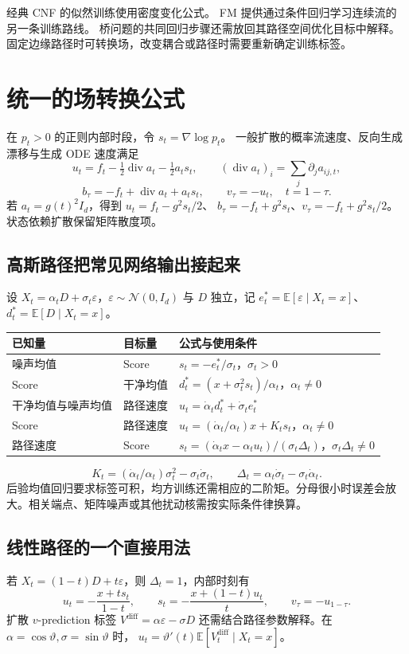 \documentclass[language=chinese,margin=right,11pt]{lumenbook}
\begin{document}
经典 CNF 的似然训练使用密度变化公式。
FM 提供通过条件回归学习连续流的另一条训练路线。
桥问题的共同回归步骤还需放回其路径空间优化目标中解释。
固定边缘路径时可转换场，改变耦合或路径时需要重新确定训练标签。

\clearpage
\section*{统一的场转换公式}

在 \(p_t>0\) 的正则内部时段，令 \(s_t=\nabla\log p_t\)。
一般扩散的概率流速度、反向生成漂移与生成 ODE 速度满足
\[
 \boxed{u_t=f_t-\tfrac12\operatorname{div}a_t-\tfrac12a_ts_t},
 \qquad (\operatorname{div}a_t)_i=\sum_j\partial_j a_{ij,t},
\]
\[
 \boxed{b_\tau=-f_t+\operatorname{div}a_t+a_ts_t},\qquad
 \boxed{v_\tau=-u_t},\quad t=1-\tau.
\]
若 \(a_t=g(t)^2I_d\)，得到 \(u_t=f_t-g^2s_t/2\)、
\(b_\tau=-f_t+g^2s_t\)、\(v_\tau=-f_t+g^2s_t/2\)。
状态依赖扩散保留矩阵散度项。

\subsection*{高斯路径把常见网络输出接起来}
设 \(X_t=\alpha_tD+\sigma_t\varepsilon\)，\(\varepsilon\sim\mathcal N(0,I_d)\)
与 \(D\) 独立，记 \(e_t^*=\mathbb E[\varepsilon\mid X_t=x]\)、
\(d_t^*=\mathbb E[D\mid X_t=x]\)。
\par\noindent
\begin{tabularx}{\textwidth}{@{}llX@{}}
\toprule
已知量 & 目标量 & 公式与使用条件 \\
\midrule
噪声均值 & Score & \(s_t=-e_t^*/\sigma_t\)，\(\sigma_t>0\) \\
Score & 干净均值 & \(d_t^*=(x+\sigma_t^2s_t)/\alpha_t\)，\(\alpha_t\ne0\) \\
干净均值与噪声均值 & 路径速度 & \(u_t=\dot\alpha_td_t^*+\dot\sigma_te_t^*\) \\
Score & 路径速度 & \(u_t=(\dot\alpha_t/\alpha_t)x+K_ts_t\)，\(\alpha_t\ne0\) \\
路径速度 & Score & \(s_t=(\dot\alpha_tx-\alpha_tu_t)/(\sigma_t\Delta_t)\)，\(\sigma_t\Delta_t\ne0\) \\
\bottomrule
\end{tabularx}
\[
 K_t=(\dot\alpha_t/\alpha_t)\sigma_t^2-\sigma_t\dot\sigma_t,
 \qquad \Delta_t=\alpha_t\dot\sigma_t-\sigma_t\dot\alpha_t.
\]
后验均值回归要求标签可积，均方训练还需相应的二阶矩。分母很小时误差会放大。相关端点、矩阵噪声或其他扰动核需按实际条件律换算。

\subsection*{线性路径的一个直接用法}
若 \(X_t=(1-t)D+t\varepsilon\)，则 \(\Delta_t=1\)，内部时刻有
\[
 u_t=-\frac{x+ts_t}{1-t},\qquad
 s_t=-\frac{x+(1-t)u_t}{t},\qquad v_\tau=-u_{1-\tau}.
\]
扩散 \(v\)-prediction 标签 \(V^{\mathrm{diff}}=\alpha\varepsilon-\sigma D\)
还需结合路径参数解释。在 \(\alpha=\cos\vartheta,\sigma=\sin\vartheta\) 时，
\(u_t=\vartheta'(t)\mathbb E[V_t^{\mathrm{diff}}\mid X_t=x]\)。
\end{document}
